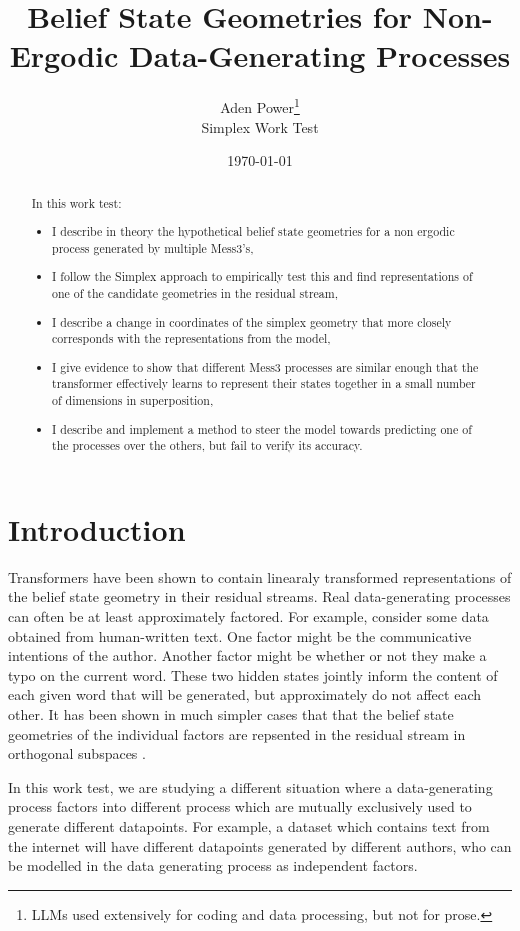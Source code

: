 \documentclass[11pt,a4paper]{article}
\title{Belief State Geometries for Non-Ergodic Data-Generating Processes}
\author{Aden Power\thanks{LLMs used extensively for coding and data processing, but not for prose.} \\ Simplex Work Test}
\date{\today}
\begin{document}
\maketitle
\thispagestyle{fancy}

\begin{abstract}
In this work test:
\begin{itemize}
\item I describe in theory the hypothetical belief state geometries for a non ergodic process generated by multiple Mess3's,
\item I follow the Simplex approach to empirically test this and find representations of one of the candidate geometries in the residual stream,
\item I describe a change in coordinates of the simplex geometry that more closely corresponds with the representations from the model,
\item I give evidence to show that different Mess3 processes are similar enough that the transformer effectively learns to represent their states together in a small number of dimensions in superposition,
\item I describe and implement a method to steer the model towards predicting one of the processes over the others, but fail to verify its accuracy.
\end{itemize}
\end{abstract}

\section{Introduction}
Transformers have been shown to contain linearaly transformed representations of the belief state geometry in their residual streams. Real data-generating processes can often be at least approximately factored. For example, consider some data obtained from human-written text. One factor might be the communicative intentions of the author. Another factor might be whether or not they make a typo on the current word. These two hidden states jointly inform the content of each given word that will be generated, but approximately do not affect each other. It has been shown in much simpler cases that that the belief state geometries of the individual factors are repsented in the residual stream in orthogonal subspaces \cite{shai2024beliefgeometry,shai2026factored}. 

\vspace{5mm}

In this work test, we are studying a different situation where a data-generating process factors into different process which are mutually exclusively used to generate different datapoints. For example, a dataset which contains text from the internet will have different datapoints generated by different authors, who can be modelled in the data generating process as independent factors.
\end{document}
